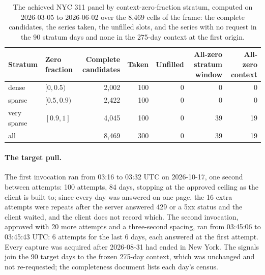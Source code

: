 \begin{table}[htbp]
\centering\footnotesize\setlength{\tabcolsep}{3.5pt}
\caption{The achieved NYC 311 panel by context-zero-fraction stratum, computed on 2026-03-05 to 2026-06-02
over the 8,469 cells of the frame: the complete candidates, the series taken, the unfilled slots, and the
series with no request in the 90 stratum days and none in the 275-day context at the first origin.}
\label{tab:s3panel}
\begin{tabular}{llrrrrr}
\toprule
Stratum & Zero fraction & Complete candidates & Taken & Unfilled & All-zero stratum window & All-zero context \\
\midrule
dense & $[0, 0.5)$ & 2,002 & 100 & 0 & 0 & 0 \\
sparse & $[0.5, 0.9)$ & 2,422 & 100 & 0 & 0 & 0 \\
very sparse & $[0.9, 1]$ & 4,045 & 100 & 0 & 39 & 19 \\
all & & 8,469 & 300 & 0 & 39 & 19 \\
\bottomrule
\end{tabular}
\end{table}

\paragraph{The target pull.} The first invocation ran from 03:16 to 03:32 UTC on 2026-10-17, one second
between attempts: 100 attempts, 84 days, stopping at the approved ceiling as the client is built to; since
every day was answered on one page, the 16 extra attempts were repeats after the server answered 429 or a
5xx status and the client waited, and the client does not record which. The second invocation, approved
with 20 more attempts and a three-second spacing, ran from 03:45:06 to 03:45:43 UTC: 6 attempts for the
last 6 days, each answered at the first attempt. Every capture was acquired after 2026-08-31 had ended in
New York. The signals join the 90 target days to the frozen 275-day context, which was unchanged and not
re-requested; the completeness document lists each day's census.

